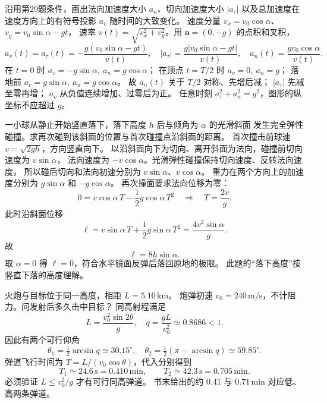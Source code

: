 沿用第29题条件，画出法向加速度大小 $a_n$、切向加速度大小 $|a_\tau|$
以及总加速度在速度方向上的有符号投影 $a_v$ 随时间的大致变化。
\exsolution
速度分量 $v_x=v_0\cos\alpha$、$v_y=v_0\sin\alpha-gt$，
速率 $v(t)=\sqrt{v_x^2+v_y^2}$。用 $\bm a=(0,-g)$ 的点积和叉积，
\[
 \boxed{a_v(t)=a_\tau(t)=-\frac{g(v_0\sin\alpha-gt)}{v(t)},\quad
 |a_\tau|=\frac{g|v_0\sin\alpha-gt|}{v(t)},\quad
 a_n(t)=\frac{gv_0\cos\alpha}{v(t)}.}
\]
在 $t=0$ 时 $a_v=-g\sin\alpha,\ a_n=g\cos\alpha$；
在顶点 $t=T/2$ 时 $a_v=0,\ a_n=g$；
落地前 $a_v=g\sin\alpha,\ a_n=g\cos\alpha$。
故 $a_n(t)$ 关于 $T/2$ 对称、先增后减；
$|a_\tau|$ 先减至零再增；
$a_v$ 从负值连续增加、过零后为正。
\excheck 任意时刻 $a_\tau^2+a_n^2=g^2$，图形的纵坐标不应超过 $g$。


一小球从静止开始竖直落下，落下高度 $h$ 后与倾角为 $\alpha$ 的光滑斜面
发生完全弹性碰撞。求再次碰到该斜面的位置与首次碰撞点沿斜面的距离。
\exsolution
首次撞击前球速 $v=\sqrt{2gh}$，方向竖直向下。
以沿斜面向下为切向、离开斜面为法向，碰撞前切向速度为 $v\sin\alpha$，
法向速度为 $-v\cos\alpha$。光滑弹性碰撞保持切向速度、反转法向速度，
所以碰后切向和法向初速分别为 $v\sin\alpha$、$v\cos\alpha$。
重力在两个方向上的加速度分别为 $g\sin\alpha$ 和 $-g\cos\alpha$。
再次撞面要求法向位移为零：
\[
 0=v\cos\alpha\,T-\frac12g\cos\alpha\,T^2
 \quad\Longrightarrow\quad T=\frac{2v}{g}.
\]
此时沿斜面位移
\[
 \ell=v\sin\alpha\,T+\frac12g\sin\alpha\,T^2
 =\frac{4v^2\sin\alpha}{g}.
\]
故
\[
 \boxed{\ell=8h\sin\alpha.}
\]
\excheck 取 $\alpha=0$ 得 $\ell=0$，符合水平镜面反弹后落回原地的极限。
此题的“落下高度”按竖直下落的高度理解。

火炮与目标位于同一高度，相距 $L=5.10\,\mathrm{km}$。
炮弹初速 $v_0=240\,\mathrm{m/s}$，不计阻力。问发射后多久击中目标？
\exsolution
同高射程满足
\[
 L=\frac{v_0^2\sin2\theta}{g},\quad
 q=\frac{gL}{v_0^2}\simeq0.8686<1.
\]
因此有两个可行仰角
\[
 \theta_1=\tfrac12\arcsin q\simeq30.15^\circ,\quad
 \theta_2=\tfrac12(\pi-\arcsin q)\simeq59.85^\circ .
\]
弹道飞行时间为 $T=L/(v_0\cos\theta)$，代入分别得到
\[
 \boxed{T_1\simeq24.6\,\mathrm s=0.410\,\mathrm{min},\qquad
 T_2\simeq42.3\,\mathrm s=0.705\,\mathrm{min}.}
\]
\excheck 必须验证 $L\le v_0^2/g$ 才有可行同高弹道。
书末给出的约 $0.41$ 与 $0.71\,\mathrm{min}$ 对应低、高两条弹道。

